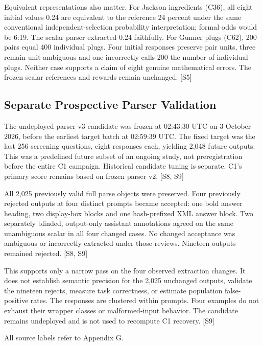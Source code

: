 \documentclass[12pt,a4paper]{report}
\begin{document}
Equivalent representations also matter. For Jackson ingredients (C36),
all eight initial values 0.24 are equivalent to the reference 24 percent
under the same conventional independent-selection probability
interpretation; formal odds would be 6:19. The scalar parser extracted
0.24 faithfully. For Gunner plugs (C62), 200 pairs equal 400 individual
plugs. Four initial responses preserve pair units, three remain
unit-ambiguous and one incorrectly calls 200 the number of individual
plugs. Neither case supports a claim of eight genuine mathematical
errors. The frozen scalar references and rewards remain unchanged.
{[}S5{]}

\subsection{Separate Prospective Parser
Validation}\label{separate-prospective-parser-validation}

The undeployed parser v3 candidate was frozen at 02:43:30 UTC on 3
October 2026, before the earliest target batch at 02:59:39 UTC. The
fixed target was the last 256 screening questions, eight responses each,
yielding 2,048 future outputs. This was a predefined future subset of an
ongoing study, not preregistration before the entire C1 campaign.
Historical candidate tuning is separate. C1's primary score remains
based on frozen parser v2. {[}S8, S9{]}

All 2,025 previously valid full parse objects were preserved. Four
previously rejected outputs at four distinct prompts became accepted:
one bold answer heading, two display-box blocks and one hash-prefixed
XML answer block. Two separately blinded, output-only assistant
annotations agreed on the same unambiguous scalar in all four changed
cases. No changed acceptance was ambiguous or incorrectly extracted
under those reviews. Nineteen outputs remained rejected. {[}S8, S9{]}

This supports only a narrow pass on the four observed extraction
changes. It does not establish semantic precision for the 2,025
unchanged outputs, validate the nineteen rejects, measure task
correctness, or estimate population false-positive rates. The responses
are clustered within prompts. Four examples do not exhaust their wrapper
classes or malformed-input behavior. The candidate remains undeployed
and is not used to recompute C1 recovery. {[}S9{]}

All source labels refer to Appendix G.
\end{document}
